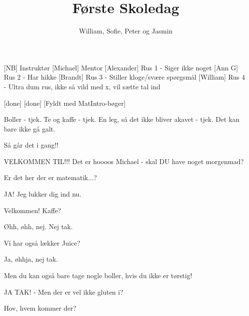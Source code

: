 \documentclass[a4paper,11pt]{article}
\title{Første Skoledag}
\author{William, Sofie, Peter og Jasmin}
\begin{document}
\maketitle

\begin{roles}
[NB] Instruktør
[Michael] Mentor
[Alexander] Rus 1 - Siger ikke noget
[Ann G] Rus 2 - Har hikke
[Brandt] Rus 3 - Stiller kloge/svære spørgsmål
[William] Rus 4 - Ultra dum rus, ikke så vild med x, vil sætte tal ind
\end{roles}

\begin{props}
[done]
[done]
[Fyldt med MatIntro-bøger]
\end{props}
  
\begin{sketch}

 Boller - tjek. Te og kaffe - tjek. En leg, så det ikke bliver akavet - tjek. Det kan bare ikke gå galt.


 Så går det i gang!!

 VELKOMMEN TIL!!! Det er hoooos Michael - skal DU have noget morgenmad?


 Er det her der er matematik...?

 JA! Jeg lukker dig ind nu.


 Velkommen! Kaffe?


 Øhh, øhh, nej. Nej tak.

 Vi har også lækker Juice?

 Ja, øhhja, nej tak.

 Men du kan også bare tage nogle boller, hvis du ikke er tørstig!

 JA TAK! - Men der er vel ikke gluten i? 


 Hov, hvem kommer der?


\end{sketch}
\end{document}
